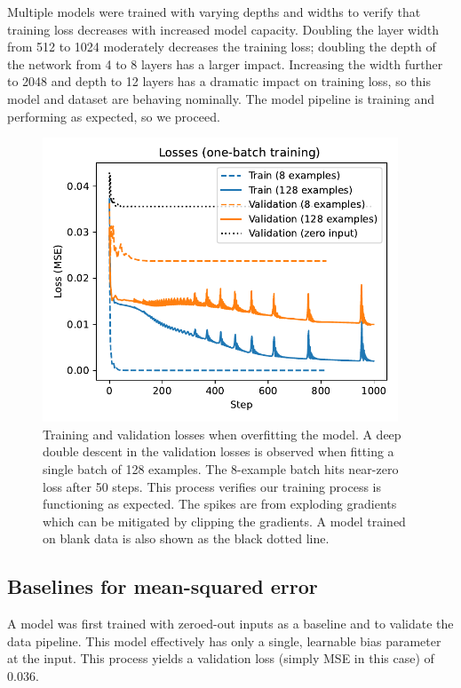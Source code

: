 Multiple models were trained with varying depths and widths to verify that training loss decreases with increased model capacity. Doubling the layer width from 512 to 1024 moderately decreases the training loss; doubling the depth of the network from 4 to 8 layers has a larger impact. Increasing the width further to 2048 and depth to 12 layers has a dramatic impact on training loss, so this model and dataset are behaving nominally. The model pipeline is training and performing as expected, so we proceed.

\begin{figure}
	\centering
	\includegraphics[width=300pt]{figures/PP1_overfit_losses.pdf}
	\caption[size=12]{\label{fig:PP1_overfit_losses}Training and validation losses when overfitting the model. A deep double descent in the validation losses is observed when fitting a single batch of 128 examples. The 8-example batch hits near-zero loss after 50 steps. This process verifies our training process is functioning as expected. The spikes are from exploding gradients which can be mitigated by clipping the gradients. A model trained on blank data is also shown as the black dotted line.}
\end{figure}

\subsection{Baselines for mean-squared error}
\label{sec:baselines}

A model was first trained with zeroed-out inputs as a baseline and to validate the data pipeline. This model effectively has only a single, learnable bias parameter at the input. This process yields a validation loss (simply MSE in this case) of 0.036. 

